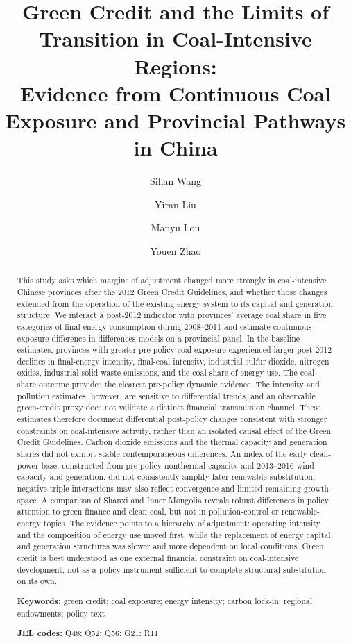 \documentclass[11pt]{article}
\title{Green Credit and the Limits of Transition in Coal-Intensive Regions:\\
Evidence from Continuous Coal Exposure and Provincial Pathways in China}
\author{Sihan Wang \and Yiran Liu \and Manyu Lou \and Youen Zhao}
\date{}
\begin{document}
\maketitle

\begin{abstract}
This study asks which margins of adjustment changed more strongly in coal-intensive Chinese provinces after the 2012 Green Credit Guidelines, and whether those changes extended from the operation of the existing energy system to its capital and generation structure. We interact a post-2012 indicator with provinces' average coal share in five categories of final energy consumption during 2008--2011 and estimate continuous-exposure difference-in-differences models on a provincial panel. In the baseline estimates, provinces with greater pre-policy coal exposure experienced larger post-2012 declines in final-energy intensity, final-coal intensity, industrial sulfur dioxide, nitrogen oxides, industrial solid waste emissions, and the coal share of energy use. The coal-share outcome provides the clearest pre-policy dynamic evidence. The intensity and pollution estimates, however, are sensitive to differential trends, and an observable green-credit proxy does not validate a distinct financial transmission channel. These estimates therefore document differential post-policy changes consistent with stronger constraints on coal-intensive activity, rather than an isolated causal effect of the Green Credit Guidelines. Carbon dioxide emissions and the thermal capacity and generation shares did not exhibit stable contemporaneous differences. An index of the early clean-power base, constructed from pre-policy nonthermal capacity and 2013--2016 wind capacity and generation, did not consistently amplify later renewable substitution; negative triple interactions may also reflect convergence and limited remaining growth space. A comparison of Shanxi and Inner Mongolia reveals robust differences in policy attention to green finance and clean coal, but not in pollution-control or renewable-energy topics. The evidence points to a hierarchy of adjustment: operating intensity and the composition of energy use moved first, while the replacement of energy capital and generation structures was slower and more dependent on local conditions. Green credit is best understood as one external financial constraint on coal-intensive development, not as a policy instrument sufficient to complete structural substitution on its own.

\noindent\textbf{Keywords:} green credit; coal exposure; energy intensity; carbon lock-in; regional endowments; policy text

\noindent\textbf{JEL codes:} Q48; Q52; Q56; G21; R11
\end{abstract}
\end{document}
